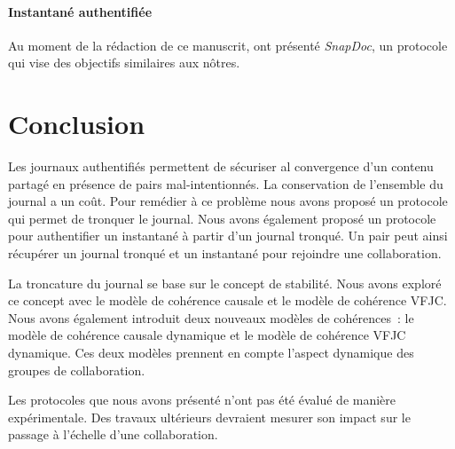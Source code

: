 \paragraph{Instantané authentifiée} Au moment de la rédaction de ce manuscrit, \textcite{kollmann2019_snapdoc} ont présenté \emph{SnapDoc}, un protocole qui vise des objectifs similaires aux nôtres.


\section{Conclusion}

Les journaux authentifiés permettent de sécuriser al convergence d'un contenu partagé en présence de pairs mal-intentionnés.
La conservation de l'ensemble du journal a un coût.
Pour remédier à ce problème nous avons proposé un protocole qui permet de tronquer le journal.
Nous avons également proposé un protocole pour authentifier un instantané à partir d'un journal tronqué.
Un pair peut ainsi récupérer un journal tronqué et un instantané pour rejoindre une collaboration.

La troncature du journal se base sur le concept de stabilité.
Nous avons exploré ce concept avec le modèle de cohérence causale et le modèle de cohérence \ac{VFJC}.
Nous avons également introduit deux nouveaux modèles de cohérences~: le modèle de cohérence causale dynamique et le modèle de cohérence \ac{VFJC} dynamique.
Ces deux modèles prennent en compte l'aspect dynamique des groupes de collaboration.

Les protocoles que nous avons présenté n'ont pas été évalué de manière expérimentale.
Des travaux ultérieurs devraient mesurer son impact sur le passage à l'échelle d'une collaboration.
